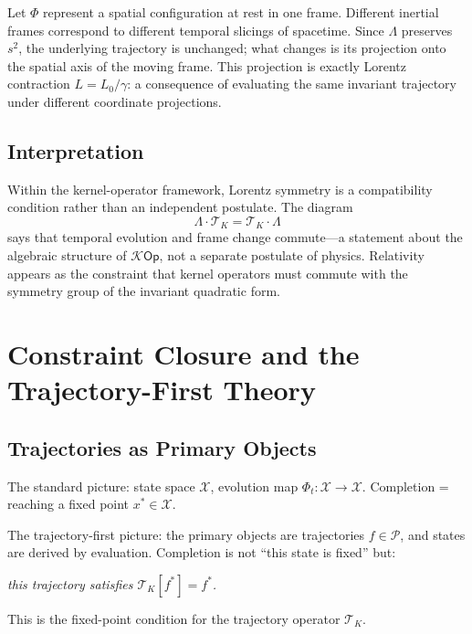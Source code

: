 \documentclass[12pt]{article}
\newcommand{\Pcal}{\mathcal{P}}
\newcommand{\Kcal}{\mathcal{K}}
\newcommand{\TK}{\mathcal{T}_K}
\begin{document}
Let $\Phi$ represent a spatial configuration at rest in one frame.
Different inertial frames correspond to different temporal slicings of
spacetime. Since $\Lambda$ preserves $s^2$, the underlying trajectory is
unchanged; what changes is its projection onto the spatial axis of the
moving frame. This projection is exactly Lorentz contraction
$L = L_0/\gamma$: a consequence of evaluating the same invariant trajectory
under different coordinate projections.

\subsection{Interpretation}

Within the kernel-operator framework, Lorentz symmetry is a compatibility
condition rather than an independent postulate. The diagram
\[
  \Lambda\cdot\TK = \TK\cdot\Lambda
\]
says that temporal evolution and frame change commute---a statement about
the algebraic structure of $\Kcal\mathsf{Op}$, not a separate postulate
of physics. Relativity appears as the constraint that kernel operators
must commute with the symmetry group of the invariant quadratic form.

\section{Constraint Closure and the Trajectory-First Theory}
\label{sec:constraint}

\subsection{Trajectories as Primary Objects}

The standard picture: state space $\mathcal{X}$, evolution map $\Phi_t
\colon \mathcal{X} \to \mathcal{X}$. Completion = reaching a fixed point
$x^* \in \mathcal{X}$.

The trajectory-first picture: the primary objects are trajectories
$f \in \Pcal$, and states are derived by evaluation. Completion is not
``this state is fixed'' but:

\begin{center}
\textit{this trajectory satisfies $\mathcal{T}_K[f^*] = f^*$.}
\end{center}

This is the fixed-point condition for the trajectory operator $\TK$.
\end{document}

